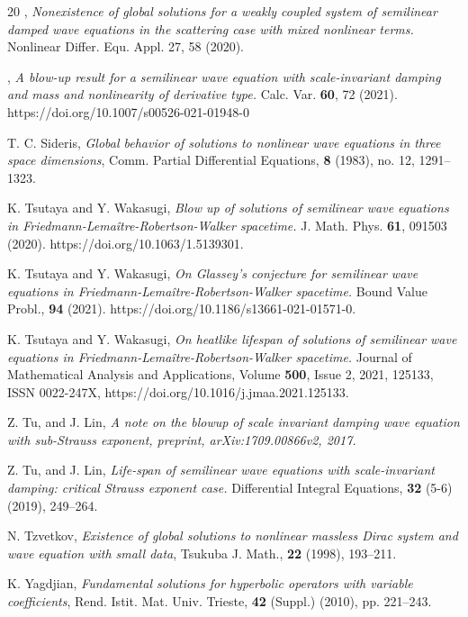 \documentclass[12pt,leqno]{amsart}
\numberwithin{equation}{section}
\theoremstyle{remark}
\begin{document}
\begin{thebibliography}{20}
,
{\it  Nonexistence of global solutions for a weakly coupled system of semilinear damped wave equations in the scattering case with mixed nonlinear terms.}  	Nonlinear Differ. Equ. Appl. 27, 58 (2020).




,
{\it A blow-up result for a semilinear wave equation with scale-invariant damping and mass and nonlinearity of derivative type.} Calc. Var. {\bf 60}, 72 (2021). https://doi.org/10.1007/s00526-021-01948-0



{T. C. Sideris}, {\it Global behavior of solutions to nonlinear wave equations in three space dimensions}, Comm. Partial Differential Equations, {\bf 8} (1983), no. 12, 
1291--1323.


 {K. Tsutaya and Y. Wakasugi,} {\it Blow up of solutions of semilinear wave equations in
Friedmann-Lema\^itre-Robertson-Walker spacetime.} J. Math. Phys. {\bf 61}, 091503 (2020).
https://doi.org/10.1063/1.5139301.

 {K. Tsutaya and Y. Wakasugi,} {\it On Glassey's conjecture for semilinear wave equations in Friedmann-Lemaître-Robertson-Walker spacetime.} Bound Value Probl., {\bf 94} (2021). https://doi.org/10.1186/s13661-021-01571-0.

 {K. Tsutaya and Y. Wakasugi,} {\it On heatlike lifespan of solutions of semilinear wave equations in Friedmann-Lema\^itre-Robertson-Walker spacetime.} Journal of Mathematical Analysis and Applications,
Volume {\bf 500}, Issue 2,
2021,
125133,
ISSN 0022-247X,
https://doi.org/10.1016/j.jmaa.2021.125133.

{Z. Tu,  and  J. Lin}, {\it  A note on the blowup of scale invariant damping wave equation with sub-Strauss exponent, preprint, arXiv:1709.00866v2, 2017. }

{Z. Tu,  and  J. Lin}, {\it  
Life-span of semilinear wave equations with scale-invariant damping: critical Strauss exponent case. }
Differential Integral Equations, {\bf 32} (5-6) (2019), 249--264.


{N. Tzvetkov}, {\it Existence of global solutions to nonlinear massless Dirac system and wave equation
with small data}, Tsukuba J. Math., {\bf 22} (1998), 193--211.



{K. Yagdjian}, {\it Fundamental solutions for hyperbolic operators with variable coefficients}, 
Rend. Istit. Mat. Univ. Trieste, {\bf 42} (Suppl.) (2010), pp. 221--243.



\end{thebibliography}
\end{document}
